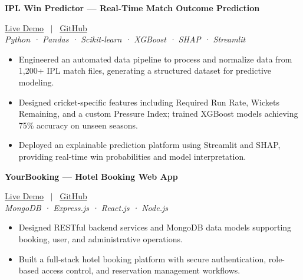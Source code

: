 \documentclass[10pt, a4paper]{article}
\begin{document}
\noindent \textbf{IPL Win Predictor --- Real-Time Match Outcome Prediction} \hfill 

\small{
\href{https://ipl-win-probability-predictor-fpzxwaxr5tepzwdugousfe.streamlit.app/}{Live Demo}
 \ $|$ \ \href{https://github.com/PankajKumar-11/IPL-Win-Probability-Predictor}{GitHub}
}
 \\
\textit{\small{Python · Pandas · Scikit-learn · XGBoost · SHAP · Streamlit}}
\begin{itemize}

    \item Engineered an automated data pipeline to process and normalize data from 1,200+ IPL match files, generating a structured dataset for predictive modeling.

    \item Designed cricket-specific features including Required Run Rate, Wickets Remaining, and a custom Pressure Index; trained XGBoost models achieving 75\% accuracy on unseen seasons.

    \item Deployed an explainable prediction platform using Streamlit and SHAP, providing real-time win probabilities and model interpretation.

\end{itemize}
\vspace{3pt}

\noindent \textbf{YourBooking --- Hotel Booking Web App} \hfill 

\small{
\href{https://yourbookingweb.netlify.app/}{Live Demo}
 \ $|$ \ \href{https://github.com/PankajKumar-11/YourBooking-Hotel-booking-Web-}{GitHub}
}
 \\
\textit{\small{MongoDB · Express.js · React.js · Node.js}}
\begin{itemize}

    \item Designed RESTful backend services and MongoDB data models supporting booking, user, and administrative operations.

    \item Built a full-stack hotel booking platform with secure authentication, role-based access control, and reservation management workflows.

\end{itemize}
\vspace{3pt}


\end{document}
